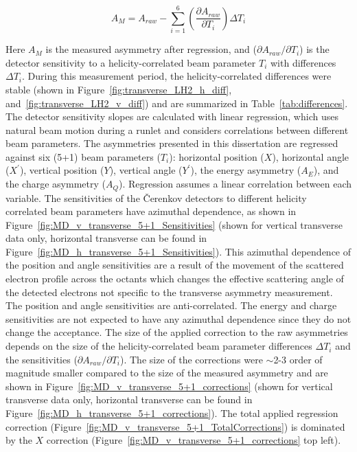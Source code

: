 \begin{equation} \label{equ:regression}
A_{M} = A_{raw} - \sum^{6}_{i=1} \left(\frac{\partial A_{raw} }{ \partial T_{i} }\right) \Delta T_{i}
\end{equation}

Here $A_{M}$ is the measured asymmetry after regression, and ($\partial A_{raw}/\partial T_{i}$) is the detector sensitivity to a helicity-correlated beam parameter $T_{i}$ with differences $\Delta T_{i}$. During this measurement period, the helicity-correlated differences were stable (shown in Figure~\ref{fig:transverse_LH2_h_diff}, and~\ref{fig:transverse_LH2_v_diff}) and are summarized in Table~\ref{tab:differences}. The detector sensitivity slopes are calculated with linear regression, which uses natural beam motion during a runlet and considers correlations between different beam parameters. The asymmetries presented in this dissertation are regressed against six (5+1) beam parameters ($T_{i}$): horizontal position ($X$), horizontal angle ($X^{\prime}$), vertical position ($Y$), vertical angle ($Y^{\prime}$), the energy asymmetry ($A_{E}$), and the charge asymmetry ($A_{Q}$). Regression assumes a linear correlation between each variable. The sensitivities of the \v{C}erenkov detectors to different helicity correlated beam parameters have azimuthal dependence, as shown in Figure~\ref{fig:MD_v_transverse_5+1_Sensitivities} (shown for vertical transverse data only, horizontal transverse can be found in Figure~\ref{fig:MD_h_transverse_5+1_Sensitivities}). This azimuthal dependence of the position and angle sensitivities are a result of the movement of the scattered electron profile across the octants which changes the effective scattering angle of the detected electrons not specific to the transverse asymmetry measurement. The position and angle sensitivities are anti-correlated. The energy and charge sensitivities are not expected to have any azimuthal dependence since they do not change the acceptance.
The size of the applied correction to the raw asymmetries depends on the size of the helicity-correlated beam parameter differences $\Delta T_{i}$ and the sensitivities ($\partial A_{raw}/\partial T_{i}$). The size of the corrections were $\sim$2-3 order of magnitude smaller compared to the size of the measured asymmetry and are shown in Figure~\ref{fig:MD_v_transverse_5+1_corrections} (shown for vertical transverse data only, horizontal transverse can be found in Figure~\ref{fig:MD_h_transverse_5+1_corrections}). The total applied regression correction (Figure~\ref{fig:MD_v_transverse_5+1_TotalCorrections}) is dominated by the $X$ correction (Figure~\ref{fig:MD_v_transverse_5+1_corrections} top left).

